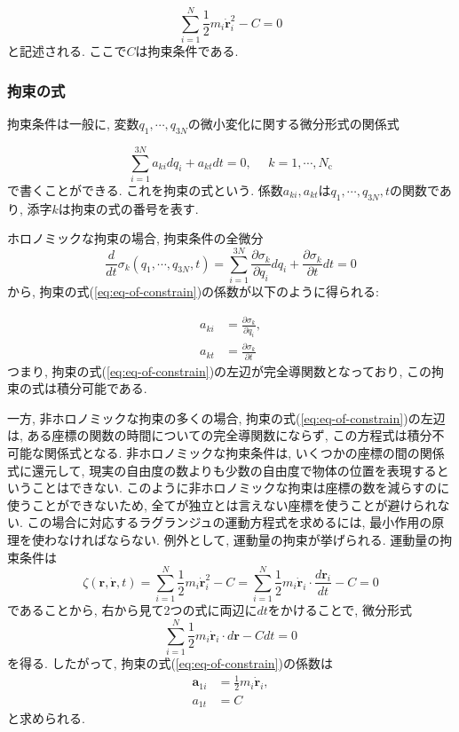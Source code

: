 \begin{equation}
  \sum_{i = 1}^{N} \frac{1}{2} m_{i} \dot{\bm{r}}_{i}^{2} - C = 0
\end{equation}
と記述される. ここで$C$は拘束条件である. 

\subsubsection{拘束の式}
拘束条件は一般に, 変数$q_{1}, \cdots, q_{3N}$の微小変化に関する微分形式の関係式

\begin{equation}
  \sum_{i = 1}^{3N} a_{ki} dq_{i} + a_{kt} dt = 0,~~~~~~ k = 1,\cdots, N_{\mathrm{c}}
  \label{eq:eq-of-constrain}
\end{equation}
で書くことができる. これを拘束の式という. 係数$a_{ki}, a_{kt}$は$q_{1}, \cdots, q_{3N}, t$の関数であり, 添字$k$は拘束の式の番号を表す. 

ホロノミックな拘束の場合, 拘束条件の全微分
\begin{equation}
  \frac{d}{d t} \sigma_{k} (q_1, \cdots, q_{3N}, t)
  =
  \sum_{i = 1}^{3N} \frac{\partial \sigma_{k}}{\partial q_{i}} d q_{i}
  + \frac{\partial \sigma_{k}}{\partial t} dt
  = 0
\end{equation}
から, 拘束の式(\ref{eq:eq-of-constrain})の係数が以下のように得られる:

\begin{align}
  a_{ki} &= \frac{\partial \sigma_{k}}{\partial q_{i}}, \\
  a_{kt} &= \frac{\partial \sigma_{k}}{\partial t}
\end{align}
つまり, 拘束の式(\ref{eq:eq-of-constrain})の左辺が完全導関数となっており, この拘束の式は積分可能である. 

一方, 非ホロノミックな拘束の多くの場合, 拘束の式(\ref{eq:eq-of-constrain})の左辺は, ある座標の関数の時間についての完全導関数にならず, この方程式は積分不可能な関係式となる. 非ホロノミックな拘束条件は, いくつかの座標の間の関係式に還元して, 現実の自由度の数よりも少数の自由度で物体の位置を表現するということはできない. このように非ホロノミックな拘束は座標の数を減らすのに使うことができないため, 全てが独立とは言えない座標を使うことが避けられない. この場合に対応するラグランジュの運動方程式を求めるには, 最小作用の原理を使わなければならない. 例外として, 運動量の拘束が挙げられる. 運動量の拘束条件は
\begin{equation}
  \zeta(\bm{r}, \dot{\bm{r}}, t)
  = \sum_{i = 1}^{N} \frac{1}{2} m_{i} \dot{\bm{r}}_{i}^{2} - C
  = \sum_{i = 1}^{N} \frac{1}{2} m_{i} \dot{\bm{r}}_{i} \cdot \frac{d \bm{r}_{i}}{dt} - C
  = 0
\end{equation}
であることから, 右から見て2つの式に両辺に$dt$をかけることで, 微分形式
\begin{equation}
  \sum_{i = 1}^{N} \frac{1}{2} m_{i} \dot{\bm{r}}_{i} \cdot d \bm{r} - C dt = 0
\end{equation}
を得る. したがって, 拘束の式(\ref{eq:eq-of-constrain})の係数は
\begin{align}
  \bm{a}_{1i} &= \frac{1}{2} m_{i} \dot{\bm{r}}_{i}, \\
  a_{1t} &= C
\end{align}
と求められる. 

